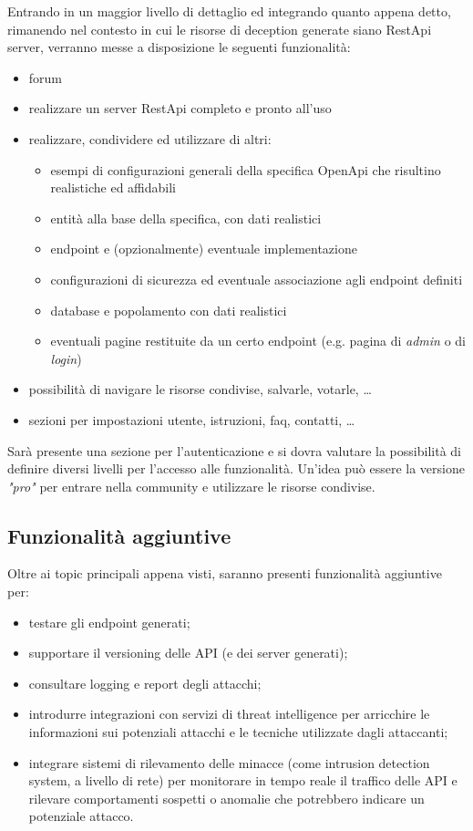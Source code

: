 \newpage
\noindent
Entrando in un maggior livello di dettaglio ed integrando quanto appena detto, rimanendo nel contesto in cui le risorse di deception generate siano RestApi server, verranno messe a disposizione le seguenti funzionalità:
\begin{itemize}
    \item forum
    \item realizzare un server RestApi completo e pronto all'uso
    \item realizzare, condividere ed utilizzare di altri:
    \begin{itemize}
        \item esempi di configurazioni generali della specifica OpenApi che risultino realistiche ed affidabili
        \item entità alla base della specifica, con dati realistici
        \item endpoint e (opzionalmente) eventuale implementazione
        \item configurazioni di sicurezza ed eventuale associazione agli endpoint definiti
        \item database e popolamento con dati realistici
        \item eventuali pagine restituite da un certo endpoint (e.g. pagina di \textit{admin} o di \textit{login})
    \end{itemize}
    \item possibilità di navigare le risorse condivise, salvarle, votarle, \dots
    \item sezioni per impostazioni utente, istruzioni, faq, contatti, \dots
\end{itemize}

\noindent Sarà presente una sezione per l'autenticazione e si dovra valutare la possibilità di definire diversi livelli per l'accesso alle funzionalità. Un'idea può essere la versione \textit{"pro"} per entrare nella community e utilizzare le risorse condivise.


\subsection{Funzionalità aggiuntive}
Oltre ai topic principali appena visti, saranno presenti funzionalità aggiuntive per:
\begin{itemize}
    \item testare gli endpoint generati;
    \item supportare il versioning delle API (e dei server generati);
    \item consultare logging e report degli attacchi;
    \item introdurre integrazioni con servizi di threat intelligence per arricchire le informazioni sui potenziali attacchi e le tecniche utilizzate dagli attaccanti;
    \item integrare sistemi di rilevamento delle minacce (come intrusion detection system, a livello di rete) per monitorare in tempo reale il traffico delle API e rilevare comportamenti sospetti o anomalie che potrebbero indicare un potenziale attacco.
\end{itemize}


